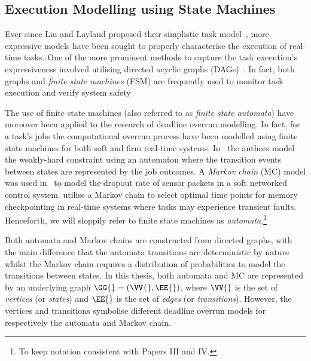 \subsection{Execution Modelling using State Machines}%
\label{sec:background:fsm}%
%
Ever since Liu and Layland proposed their simplistic task model~\cite{Liu:1973}, more expressive models have been sought to properly characterise the execution of real-time tasks.
One of the more prominent methods to capture the task execution's expressiveness involved utilising directed acyclic graphs (DAGs)~\cite{Baruah:2003, Chakraborty:2005, Stigge:2011}.
In fact, both graphs and \emph{finite state machines} (FSM) are frequently used to monitor task execution and verify system safety~\cite{Kumar:2012, Dai:2020, Hertneck:2020}

The use of finite state machines (also referred to as \emph{finite state automata}) have moreover been applied to the research of deadline overrun modelling.
In fact, for a task's jobs the computational overrun process have been modelled using finite state machines for both soft and firm real-time systems.
In~\cite{Horssen:2016} the authors model the \tAM{} weakly-hard constraint using an automaton where the transition events between states are represented by the job outcomes.
A \emph{Markov chain} (MC) model was used in~\cite{Ling:2003} to model the dropout rate of sensor packets in a soft networked control system.
\cite{Kwak:2001} utilise a Markov chain to select optimal time points for memory checkpointing in real-time systems where tasks may experience transient faults.
Henceforth, we will sloppily refer to finite state machines as \emph{automata}.\footnote{To keep notation consistent with Papers III and IV.}

Both automata and Markov chains are constructed from directed graphs, with the main difference that the automata transitions are deterministic by nature whilst the Markov chain requires a distribution of probabilities to model the transitions between states.
In this thesis, both automata and MC are represented by an underlying graph $\GG{} = (\VV{}, \EE{})$, where $\VV{}$ is the set of \emph{vertices} (or \emph{states}) and $\EE{}$ is the set of \emph{edges} (or \emph{transitions}).
However, the vertices and transitions symbolise different deadline overrun models for respectively the automata and Markov chain.

